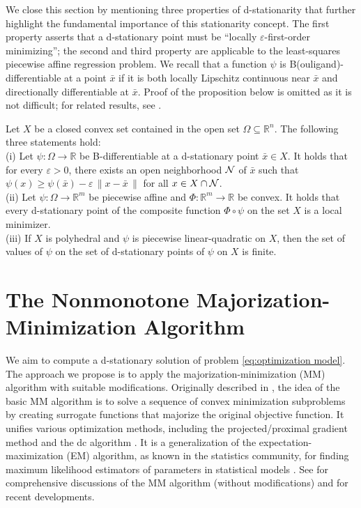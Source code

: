 \documentclass{siamart}
\begin{document}
We close this section by mentioning three properties of d-stationarity that further highlight the fundamental importance of this
stationarity concept.  The first property asserts that a d-stationary point must be ``locally $\varepsilon$-first-order minimizing'';
the second and third property are applicable to the least-squares piecewise affine regression problem.
We recall that a function $\psi$ is B(ouligand)-differentiable at a point $\bar{x}$ \cite[Definition~3.1.2]{FacchineiPang2003}
if it is both locally Lipschitz continuous near $\bar{x}$ and directionally differentiable at $\bar{x}$.
Proof of the proposition below
is omitted as it is not difficult; for related results, see \cite{CuiPang18,ChangHongPang17}.


\begin{proposition} \label{pr:properties of d-stat}
Let $X$ be a closed convex set contained in the open set $\Omega \subseteq \mathbb{R}^n$.  The following three statements hold:\\
(i) Let $\psi : \Omega \to \mathbb{R}$ be B-differentiable at a d-stationary point $\bar{x} \in X$.
It holds that for every $\varepsilon > 0$, there exists an open neighborhood ${\cal N}$ of $\bar{x}$ such that
$\psi(x) \geq \psi(\bar{x}) - \varepsilon \, \| x - \bar{x} \, \|$
for all $x \in X \cap {\cal N}$.\\
(ii) Let $\psi : \Omega \to \mathbb{R}^m$ be piecewise affine and $\Phi : \mathbb{R}^m \to \mathbb{R}$ be convex.  It holds that every
d-stationary point of the composite function $\Phi \circ \psi$ on the set $X$ is a local minimizer.\\
(iii)  If $X$ is polyhedral and $\psi$ is piecewise linear-quadratic on $X$, then the set of values of $\psi$ on the set of
d-stationary points of $\psi$ on $X$ is finite.
\end{proposition}

\section{The Nonmonotone Majorization-Minimization Algorithm} \label{sec: MM}

We aim to compute a d-stationary solution of problem \eqref{eq:optimization model}.
The approach we propose is to apply the majorization-minimization (MM) algorithm with suitable modifications.
Originally described in \cite[Section 9.3(d)]{OrtegaRheinboldt1970}, the idea of the basic MM algorithm is to solve
a sequence of convex minimization subproblems by creating surrogate functions that majorize the original objective function.
It unifies various optimization methods, including the projected/proximal gradient method \cite{Bertsekas16}
and the dc algorithm \cite{LeThiPham05,LeHuynhPham09}.  It is a generalization of the expectation-maximization (EM) algorithm, as known in the statistics community,
for finding maximum likelihood estimators of parameters in statistical models \cite{DempsterLairdRubin1977,Wu1983}.
See \cite{HunterLange2004,Lange16} for comprehensive discussions of the MM algorithm (without modifications)
and \cite{Mairal2013,Mairal2015,BoltePauwels2016} for recent developments.
\end{document}
